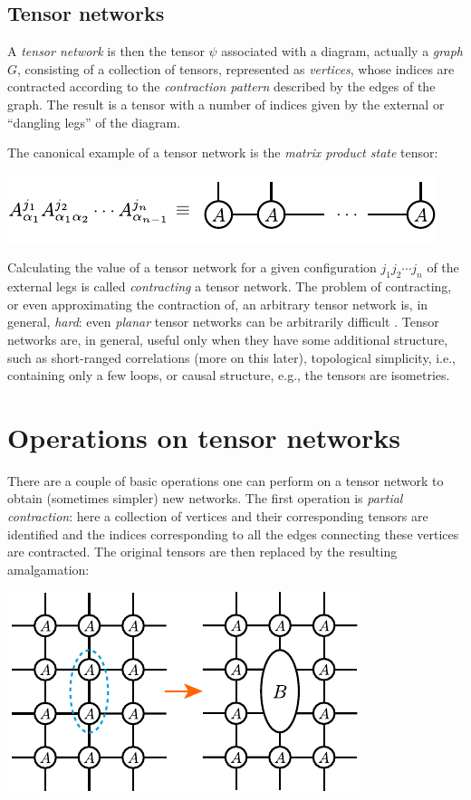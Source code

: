 \documentclass[twocolumn,lengthcheck,superscriptaddress]{revtex4-1}
\theoremstyle{definition}
\theoremstyle{remark}
\begin{document}
\subsection{Tensor networks}
A \emph{tensor network} is then the tensor $\psi$ associated with a diagram, actually a \emph{graph} $G$, consisting of a collection of tensors, represented as \emph{vertices}, whose indices are contracted according to the \emph{contraction pattern} described by the edges of the graph. The result is a tensor with a number of indices given by the external or ``dangling legs'' of the diagram. 

The canonical example of a tensor network is the \emph{matrix product state} tensor:
\begin{center}
\includegraphics{mps.pdf}
\end{center}

Calculating the value of a tensor network for a given configuration $j_1j_2\cdots j_n$ of the external legs is called \emph{contracting} a tensor network. The problem of contracting, or even approximating the contraction of, an arbitrary tensor network is, in general, \emph{hard}: even \emph{planar} tensor networks can be arbitrarily difficult \cite{schuch:2007a}. Tensor networks are, in general, useful only when they have some additional structure, such as short-ranged correlations (more on this later), topological simplicity, i.e., containing only a few loops, or causal structure, e.g., the tensors are isometries. 


\section{Operations on tensor networks}There are a couple of basic operations one can perform on a tensor network to obtain (sometimes simpler) new networks. The first operation is \emph{partial contraction}: here a collection of vertices and their corresponding tensors are identified and the indices corresponding to all the edges connecting these vertices are contracted. The original tensors are then replaced by the resulting amalgamation: 
\begin{center}
\includegraphics{partialcont.pdf}
\end{center}
\end{document}
